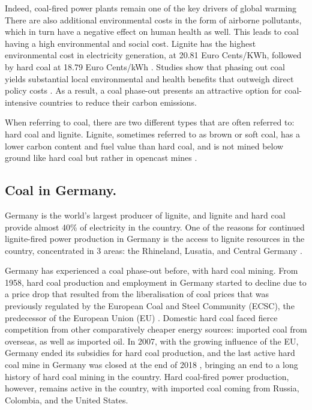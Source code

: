 \documentclass[12pt,onecolumn,twoside]{layout}
\begin{document}
Indeed, coal-fired power plants remain one of the key drivers of global warming \citep{Edwards2019,Zhao2019} There are also  additional environmental costs in the form of airborne pollutants, which in turn have a negative effect on human health as well. This leads to coal having a high environmental and social cost. Lignite has the highest environmental cost in electricity generation, at 20.81 Euro Cents/KWh, followed by hard coal at 18.79 Euro Cents/kWh \citep{Oei2020}. Studies show that phasing out coal yields substantial local environmental and health benefits that outweigh direct policy costs \citep{Rauner2020}. As a result, a coal phase-out presents an attractive option for coal-intensive countries to reduce their carbon emissions.

When referring to coal, there are two different types that are often referred to: hard coal and lignite. Lignite, sometimes referred to as brown or soft coal, has a lower carbon content and fuel value than hard coal, and is not mined below ground like hard coal but rather in opencast mines \citep{Appunn2019}.

\subsection*{Coal in Germany.}
Germany is the world's largest producer of lignite, and lignite and hard coal provide almost 40\% of electricity in the country. One of the reasons for continued lignite-fired power production in Germany is the access to lignite resources in the country, concentrated in 3 areas: the Rhineland, Lusatia, and Central Germany \citep{AgoraEnergiewende2019}.

Germany has experienced a coal phase-out before, with hard coal mining. From 1958, hard coal production and employment in Germany started to decline due to a price drop that resulted from the liberalisation of coal prices that was previously regulated by the European Coal and Steel Community (ECSC), the predecessor of the European Union (EU) \citep{Oei2019}. Domestic hard coal faced fierce competition from other comparatively cheaper energy sources: imported coal from overseas, as well as imported oil.  In 2007, with the growing influence of the EU, Germany ended its subsidies for hard coal production, and the last active hard coal mine in Germany was closed at the end of 2018 \citep{Appunn2018}, bringing an end to a long history of hard coal mining in the country. Hard coal-fired power production, however, remains active in the country, with imported coal coming from Russia, Colombia, and the United States. 
\end{document}
